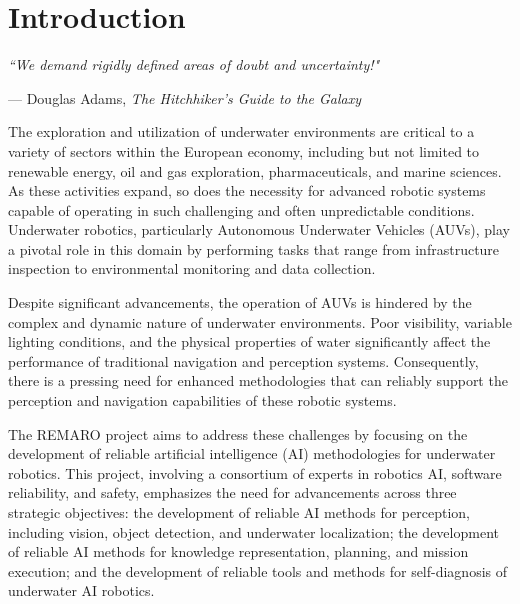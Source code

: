 \chapter{Introduction}
\epigraph{\textit{``We demand rigidly defined areas of doubt and uncertainty!"}}{--- \textup{Douglas Adams}, \textit{The Hitchhiker’s Guide to the Galaxy}}

The exploration and utilization of underwater environments are critical to a variety of sectors within the European economy, including but not limited to renewable energy, oil and gas exploration, pharmaceuticals, and marine sciences. As these activities expand, so does the necessity for advanced robotic systems capable of operating in such challenging and often unpredictable conditions. Underwater robotics, particularly Autonomous Underwater Vehicles (AUVs), play a pivotal role in this domain by performing tasks that range from infrastructure inspection to environmental monitoring and data collection.

Despite significant advancements, the operation of AUVs is hindered by the complex and dynamic nature of underwater environments. Poor visibility, variable lighting conditions, and the physical properties of water significantly affect the performance of traditional navigation and perception systems. Consequently, there is a pressing need for enhanced methodologies that can reliably support the perception and navigation capabilities of these robotic systems.


The REMARO project aims to address these challenges by focusing on the development of reliable artificial intelligence (AI) methodologies for underwater robotics. This project, involving a consortium of experts in robotics AI, software reliability, and safety, emphasizes the need for advancements across three strategic objectives: the development of reliable AI methods for perception, including vision, object detection, and underwater localization; the development of reliable AI methods for knowledge representation, planning, and mission execution; and the development of reliable tools and methods for self-diagnosis of underwater AI robotics.

